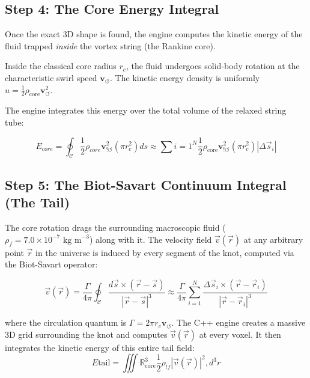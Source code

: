 \documentclass[11pt]{article}
\begin{document}
\subsection*{Step 4: The Core Energy Integral}
Once the exact 3D shape is found, the engine computes the kinetic energy of the fluid trapped \textit{inside} the vortex string (the Rankine core).

Inside the classical core radius $r_c$, the fluid undergoes solid-body rotation at the characteristic swirl speed $\mathbf{v}_{\!\boldsymbol{\circlearrowleft}}$. The kinetic energy density is uniformly $u = \frac{1}{2}\rho_{\text{core}} \mathbf{v}_{\!\boldsymbol{\circlearrowleft}}^2$.

The engine integrates this energy over the total volume of the relaxed string tube:

\begin{equation}
E_{core} = \oint_{\mathcal{C}} \frac{1}{2} \rho_{{core}} \mathbf{v}_{!\boldsymbol{\circlearrowleft}}^2 (\pi r_c^2)  ds \approx \sum{i=1}^{N} \frac{1}{2} \rho_{\text{core}} \mathbf{v}_{!\boldsymbol{\circlearrowleft}}^2 (\pi r_c^2) |\Delta \vec{s}_i|
\end{equation}

\subsection*{Step 5: The Biot-Savart Continuum Integral (The Tail)}
The core rotation drags the surrounding macroscopic fluid ($\rho_{\!f} = 7.0 \times 10^{-7} \text{ kg m}^{-3}$) along with it. The velocity field $\vec{v}(\vec{r})$ at any arbitrary point $\vec{r}$ in the universe is induced by every segment of the knot, computed via the Biot-Savart operator:

\begin{equation}
\vec{v}(\vec{r}) = \frac{\Gamma}{4\pi} \oint_{\mathcal{C}} \frac{d\vec{s} \times (\vec{r} - \vec{s})}{|\vec{r} - \vec{s}|^3}
\approx \frac{\Gamma}{4\pi} \sum_{i=1}^{N} \frac{\Delta \vec{s}_i \times (\vec{r} - \vec{r}_i)}{|\vec{r} - \vec{r}_i|^3}
\end{equation}

where the circulation quantum is \(\Gamma = 2\pi r_c \mathbf{v}_{\!\boldsymbol{\circlearrowleft}}\).
The C++ engine creates a massive 3D grid surrounding the knot and computes $\vec{v}(\vec{r})$ at every voxel. It then integrates the kinetic energy of this entire tail field:
\begin{equation}
E{\text{tail}} = \iiint{\mathbb{R}^3_\text{core}} \frac{1}{2} \rho_{!f} |\vec{v}(\vec{r})|^2 , d^3r
\end{equation}
\end{document}
